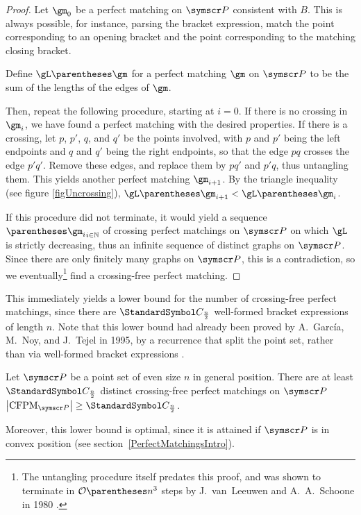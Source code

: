 \begin{proof}
Let $\gm_0$ be a perfect matching on $\pointset P$ consistent with $B$. This is always possible, for instance,
parsing the bracket expression, match the point corresponding to an opening bracket
and the point corresponding to the matching closing bracket.

Define $\gL\of\gm$ for a perfect matching $\gm$ on $\pointset P$ to be the sum of the lengths of the edges of $\gm$.

Then, repeat the following procedure, starting at $i=0$.
If there is no crossing in $\gm_i$, we have found a perfect matching with the desired properties.
If there is a crossing, let $p$, $p'$, $q$, and $q'$ be the points involved, with $p$ and $p'$ being the left
endpoints and $q$ and $q'$ being the right endpoints, so that the edge
$pq$ crosses the edge $p'q'$. Remove these edges, and replace them by $pq'$ and $p'q$, thus untangling them.
This yields another perfect matching $\gm_{i+1}$. By the triangle
inequality (see figure \ref{figUncrossing}), $\gL\of{\gm_{i+1}}<\gL\of{\gm_i}$.

If this procedure did not terminate, it would yield a sequence $\tuple{\gm_i}_{i\in\N}$ of crossing
perfect matchings on $\pointset P$ on which $\gL$ is strictly decreasing, thus an infinite sequence of distinct
graphs on $\pointset P$.
Since there are only finitely many graphs on $\pointset P$, this is a contradiction, so we
eventually\footnote{The untangling procedure itself predates this proof, and was shown to terminate in
$\BigO\of{n^3}$ steps by J.~van~Leeuwen and A.~A.~Schoone in 1980 \cite{LeeuwenSchoone1981}.}
find a
crossing-free perfect matching.
\end{proof}
This immediately yields a lower bound for the number of crossing-free perfect matchings, since
there are $\CatalanNumber {\frac n 2}$ well-formed bracket expressions of length $n$.
Note that this lower bound had already been proved by A.~García, M.~Noy, and J.~Tejel in 1995,
by a recurrence that split the point set, rather than via well-formed bracket expressions
\cite{GarciaNoyTejel2000}.
\begin{corollary}
Let $\pointset P$ be a point set of even size $n$ in general position. There are at least $\CatalanNumber {\frac n 2}$ distinct
crossing-free perfect matchings on $\pointset P$\idest $\Cardinality{\CFPM_{\pointset P}} \geq \CatalanNumber {\frac n 2}$.
\end{corollary}
Moreover, this lower bound is optimal, since it is attained if $\pointset P$ is in convex position (see
section~\ref{PerfectMatchingsIntro}).

